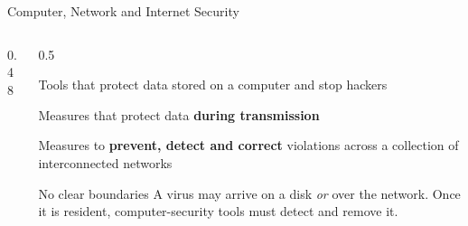 \documentclass[aspectratio=169,11pt,xcolor={table}]{beamer}
\begin{document}
\begin{frame}{Computer, Network and Internet Security}
  \begin{columns}[c]
    \begin{column}{0.48\textwidth}
      \centering
    \end{column}
    \begin{column}{0.5\textwidth}
      \begin{description}\setlength{\itemsep}{5pt}
        \item[\textcolor{leaf!70!black}{Computer security}] Tools that protect data stored on a computer and stop hackers
        \item[\textcolor{aqua!70!black}{Network security}] Measures that protect data \textbf{during transmission}
        \item[\textcolor{ocean}{Internet security}] Measures to \textbf{prevent, detect and correct} violations across a collection of interconnected networks
      \end{description}
      \vspace{2mm}
      \begin{alertblock}{No clear boundaries}
        \small A virus may arrive on a disk \emph{or} over the network. Once it is resident, computer-security tools must detect and remove it.
      \end{alertblock}
    \end{column}
  \end{columns}
\end{frame}
\end{document}
